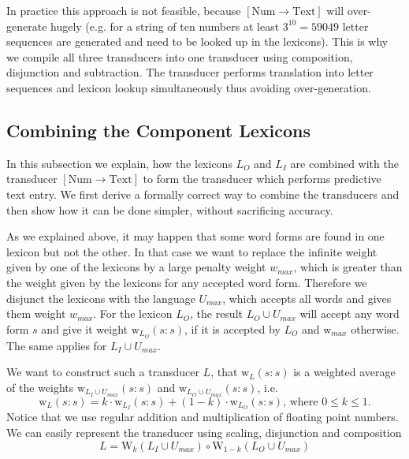 \documentclass[a4paper,conference]{IEEEtran}
\begin{document}
In practice this approach is not feasible, because
$[\mathrm{Num}\rightarrow\mathrm{Text}]$ will over-generate hugely
(e.g. for a string of ten numbers at least $3^{10} = 59049$ letter
sequences are generated and need to be looked up in the
lexicons). This is why we compile all three transducers into one
transducer using composition, disjunction and subtraction. The
transducer performs translation into letter sequences and lexicon
lookup simultaneously thus avoiding over-generation.

\subsection{Combining the Component Lexicons}

In this subsection we explain, how the lexicons $L_O$ and $L_I$ are
combined with the transducer $[\mathrm{Num}\rightarrow\mathrm{Text}]$
to form the transducer which performs predictive text entry. We first
derive a formally correct way to combine the transducers and then show
how it can be done simpler, without sacrificing accuracy.

As we explained above, it may happen that some word forms are found in
one lexicon but not the other. In that case we want to replace the
infinite weight given by one of the lexicons by a large penalty weight
$w_{max}$, which is greater than the weight given by the lexicons for
any accepted word form. Therefore we disjunct the lexicons with the
language $U_{max}$, which accepts all words and gives them weight
$w_{max}$. For the lexicon $L_O$, the result $L_O \cup U_{max}$ will
accept any word form $s$ and give it weight
$\mathrm{w}_{L_O}(s\mathrm{:}s)$, if it is accepted by $L_O$ and
$\mathrm{w}_{max}$ otherwise. The same applies for $L_I \cup U_{max}$.

We want to construct such a transducer $L$, that $\mathrm{w}_L(s\mathrm{:}s)$
is a weighted average of the weights $\mathrm{w}_{L_I \cup U_{max}}(s\mathrm{:}s)$ and
$\mathrm{w}_{L_O \cup U_{max}}(s\mathrm{:}s)$, i.e.
\begin{equation}
  \mathrm{w}_L(s\mathrm{:}s) = k\cdot \mathrm{w}_{L_I}(s\mathrm{:}s) + (1 - k)\cdot \mathrm{w}_{L_O}(s\mathrm{:}s)\text{, where }0\leq k \leq 1\text{.}
\end{equation}
Notice that we use regular addition and multiplication of floating
point numbers. We can easily represent the transducer using scaling, disjunction and composition
\begin{equation}
  L = \mathrm{W}_k(L_I \cup U_{max}) \circ \mathrm{W}_{1-k}(L_O \cup U_{max})
\end{equation}
\end{document}

